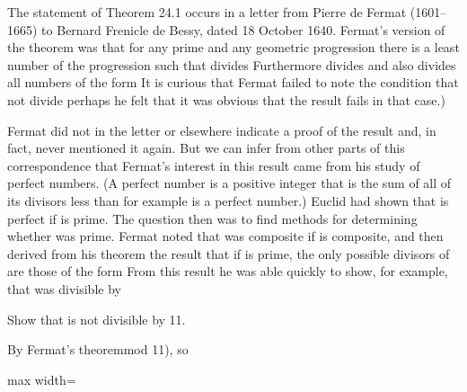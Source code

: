 \documentclass[11pt,oneside]{article}
\begin{document}
\begin{BookBody}

\noindent The statement of Theorem 24.1 occurs in a letter from Pierre de Fermat (1601–1665) to Bernard Frenicle de Bessy, dated 18 October 1640. Fermat’s version of the theorem was that for any prime  and any geometric progression  there is a least number  of the progression such that  divides  Furthermore divides  and  also divides all numbers of the form It is curious that Fermat failed to note the condition that  not divide  perhaps he felt that it was obvious that the result fails in that case.)

\noindent Fermat did not in the letter or elsewhere indicate a proof of the result and, in fact, never mentioned it again. But we can infer from other parts of this correspondence that Fermat’s interest in this result came from his study of perfect numbers. (A perfect number is a positive integer  that is the sum of all of its divisors less than  for example is a perfect number.) Euclid had shown that  is perfect if  is prime. The question then was to find methods for determining whether  was prime. Fermat noted that  was composite if  is composite, and then derived from his theorem the result that if  is prime, the only possible divisors of  are those of the form  From this result he was able quickly to show, for example, that  was divisible by 

 Show that  is not divisible by 11.

 By Fermat’s theoremmod 11), so

\begin{center}\begin{adjustbox}{max width=\linewidth}\end{adjustbox}\end{center}


\end{BookBody}
\end{document}
